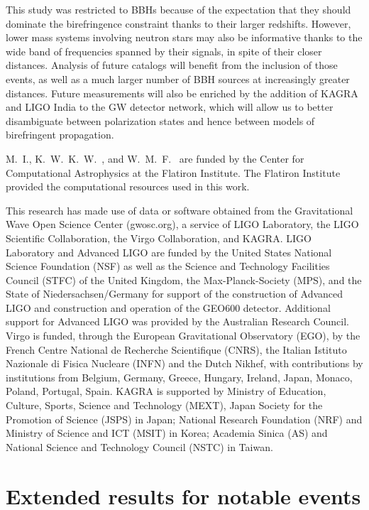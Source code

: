 \documentclass[aps,prd,twocolumn,superscriptaddress,preprintnumbers,floatfix,nofootinbib]{revtex4-2}
\begin{document}
This study was restricted to \acp{BBH} because of the expectation that they should dominate the birefringence constraint thanks to their larger redshifts.
However, lower mass systems involving neutron stars may also be informative thanks to the wide band of frequencies spanned by their signals, in spite of their closer distances.
Analysis of future catalogs will benefit from the inclusion of those events, as well as a much larger number of \ac{BBH} sources at increasingly greater distances.
Future measurements will also be enriched by the addition of KAGRA \cite{KAGRA} and LIGO India to the \ac{GW} detector network, which will allow us to better disambiguate between polarization states and hence between models of birefringent propagation.

\begin{acknowledgments}
M.~I., K.~W.~K.~W.~, and W.~M.~F.~ are funded by the Center for Computational Astrophysics at the Flatiron Institute.
The Flatiron Institute provided the computational resources used in this work.

This research has made use of data or software obtained from the Gravitational Wave Open Science Center (gwosc.org), a service of LIGO Laboratory, the LIGO Scientific Collaboration, the Virgo Collaboration, and KAGRA.
LIGO Laboratory and Advanced LIGO are funded by the United States National Science Foundation (NSF) as well as the Science and Technology Facilities Council (STFC) of the United Kingdom, the Max-Planck-Society (MPS), and the State of Niedersachsen/Germany for support of the construction of Advanced LIGO and construction and operation of the GEO600 detector.
Additional support for Advanced LIGO was provided by the Australian Research Council.
Virgo is funded, through the European Gravitational Observatory (EGO), by the French Centre National de Recherche Scientifique (CNRS), the Italian Istituto Nazionale di Fisica Nucleare (INFN) and the Dutch Nikhef, with contributions by institutions from Belgium, Germany, Greece, Hungary, Ireland, Japan, Monaco, Poland, Portugal, Spain.
KAGRA is supported by Ministry of Education, Culture, Sports, Science and Technology (MEXT), Japan Society for the Promotion of Science (JSPS) in Japan; National Research Foundation (NRF) and Ministry of Science and ICT (MSIT) in Korea; Academia Sinica (AS) and National Science and Technology Council (NSTC) in Taiwan.
\end{acknowledgments}

\appendix

\section{Extended results for notable events}
\end{document}
